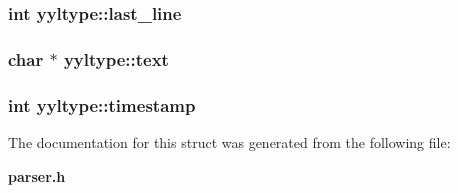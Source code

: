 \subsubsection{\setlength{\rightskip}{0pt plus 5cm}int yyltype::last\_\-line}\label{structyyltype_m3}


\subsubsection{\setlength{\rightskip}{0pt plus 5cm}char $\ast$ yyltype::text}\label{structyyltype_m5}


\subsubsection{\setlength{\rightskip}{0pt plus 5cm}int yyltype::timestamp}\label{structyyltype_m0}




The documentation for this struct was generated from the following file:\begin{CompactItemize}
\item 
{\bf parser.h}\end{CompactItemize}
